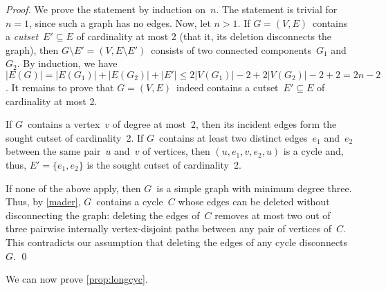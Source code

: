 \documentclass[natbib,sort,smallextended,envcountsame,envcountsect,numbook]{svjour3}
\begin{document}

\begin{proof}
  We prove the statement by induction on~\(n\).
  The statement is trivial for $n=1$,
  since such a graph has no edges.
  Now, let \(n>1\).
  If \(G=(V,E)\)~contains a \emph{cutset}~\(E'\subseteq E\)
  of cardinality at most 2
  (that it, its deletion disconnects the graph), then
  $G\setminus E'=(V,E\setminus E')$~consists of
  two connected components~$G_1$ and~$G_2$.
  By induction, we have 
  $|E(G)|=|E(G_1)|+|E(G_2)|+|E'|\le 2|V(G_1)|-2+2|V(G_2)|-2+2=2n-2$.
  It remains to prove that $G=(V,E)$~indeed contains
  a cutset~$E'\subseteq E$ of cardinality at most 2.

  If \(G\)~contains a vertex~\(v\) of degree at most~2,
  then its incident edges form the sought cutset of cardinality~2.
  If $G$~contains at least two distinct edges~\(e_1\) and~\(e_2\)
  between the same pair~\(u\) and~\(v\) of vertices,
  then \((u,e_1,v,e_2,u)\)
  is a cycle and, thus, $E'=\{e_1,e_2\}$ is the sought cutset of cardinality~2.
  
  If none of the above apply,
  then \(G\)~is a simple graph with minimum degree three.
  Thus, by \cref{mader},
  \(G\)~contains a cycle~\(C\) whose edges can be deleted
  without disconnecting the graph:
  deleting the edges of~\(C\) removes
  at most two out of three pairwise internally vertex-disjoint paths
  between any pair of vertices of~\(C\).
  This contradicts our assumption that deleting the edges of any cycle disconnects~\(G\).
  \qed
\end{proof}

\noindent We can now prove \cref{prop:longcyc}.
 
\end{document}
